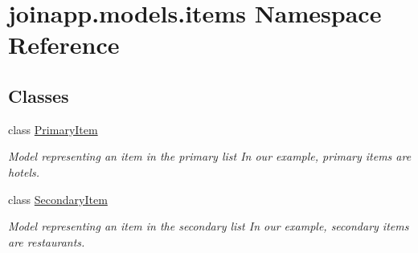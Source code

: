 \hypertarget{namespacejoinapp_1_1models_1_1items}{}\section{joinapp.\+models.\+items Namespace Reference}
\label{namespacejoinapp_1_1models_1_1items}
\subsection*{Classes}
\begin{DoxyCompactItemize}
\item 
class \mbox{\hyperlink{classjoinapp_1_1models_1_1items_1_1_primary_item}{Primary\+Item}}
\begin{DoxyCompactList}\small\item\em Model representing an item in the primary list In our example, primary items are hotels. \end{DoxyCompactList}\item 
class \mbox{\hyperlink{classjoinapp_1_1models_1_1items_1_1_secondary_item}{Secondary\+Item}}
\begin{DoxyCompactList}\small\item\em Model representing an item in the secondary list In our example, secondary items are restaurants. \end{DoxyCompactList}\end{DoxyCompactItemize}
